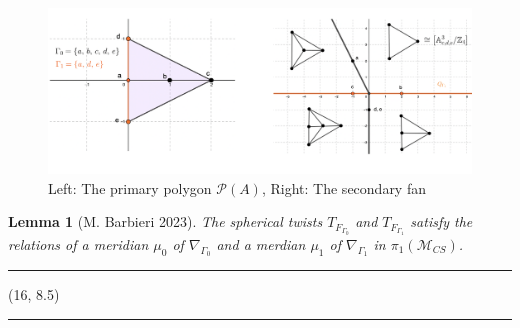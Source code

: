 \documentclass[a0]{a0poster}
\newtheorem{lemma}{Lemma}
\begin{document}
\begin{textblock}{7}
\begin{figure}
  \centering
  \includegraphics[width=30cm]{rank2.png}
  \caption{Left: The primary polygon $\mathcal{P}(A)$, Right: The secondary fan}
\end{figure}

\begin{lemma}[M. Barbieri 2023]
  The spherical twists $T_{F_{\Gamma_0}}$ and $T_{F_{\Gamma_1}}$ satisfy the relations of a meridian $\mu_{0}$ of $\nabla_{\Gamma_0}$ and a merdian $\mu_{1}$ of $\nabla_{\Gamma_1}$ in $\pi_1(\mathcal{M}_{CS})$.
\end{lemma}

\hrule
\end{textblock}

\begin{textblock}{7}(16, 8.5)
\sf


\vspace*{4mm} %

\hrule
\end{textblock}




\end{document}
